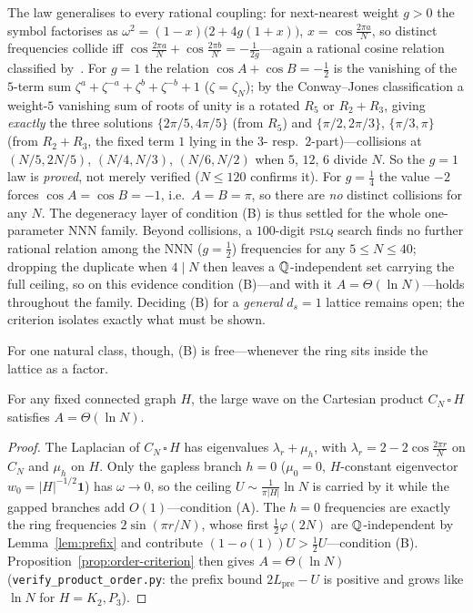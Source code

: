 \noindent The law generalises to every rational coupling: for next-nearest weight $g>0$ the symbol
factorises as $\omega^2=(1-x)\bigl(2+4g(1+x)\bigr)$, $x=\cos\tfrac{2\pi a}N$, so distinct frequencies
collide iff $\cos\tfrac{2\pi a}N+\cos\tfrac{2\pi b}N=-\tfrac1{2g}$---again a rational cosine relation
classified by~\cite{CJ}. For $g=1$ the relation $\cos A+\cos B=-\tfrac12$ is the
vanishing of the $5$-term sum $\zeta^a+\zeta^{-a}+\zeta^b+\zeta^{-b}+1$ ($\zeta=\zeta_N$); by the Conway--Jones
classification a weight-$5$ vanishing sum of roots of unity is a rotated $R_5$ or $R_2{+}R_3$, giving
\emph{exactly} the three solutions $\{2\pi/5,4\pi/5\}$ (from $R_5$) and $\{\pi/2,2\pi/3\}$, $\{\pi/3,\pi\}$ (from
$R_2{+}R_3$, the fixed term $1$ lying in the $3$- resp.\ $2$-part)---collisions at $(N/5,2N/5)$, $(N/4,N/3)$,
$(N/6,N/2)$ when $5$, $12$, $6$ divide $N$. So the $g=1$ law is \emph{proved}, not merely verified ($N\le120$
confirms it). For $g=\tfrac14$ the value $-2$ forces $\cos A=\cos B=-1$, i.e.\ $A=B=\pi$, so there are \emph{no}
distinct collisions for any $N$. The degeneracy layer of condition (B) is thus
settled for the whole one-parameter NNN family. Beyond collisions, a $100$-digit \textsc{pslq} search finds
no further rational relation among the NNN ($g=\tfrac12$) frequencies for any $5\le N\le40$; dropping the
duplicate when $4\mid N$ then leaves a $\mathbb{Q}$-independent set carrying the full ceiling, so on this evidence
condition (B)---and with it $A=\Theta(\ln N)$---holds throughout the family. Deciding (B) for a
\emph{general} $d_s=1$ lattice remains open; the criterion isolates exactly what must be shown.

For one natural class, though, (B) is free---whenever the ring sits inside the lattice as a factor.

\begin{corollary}\label{cor:product}
For any fixed connected graph $H$, the large wave on the Cartesian product $C_N\,\square\,H$ satisfies
$A=\Theta(\ln N)$.
\end{corollary}

\begin{proof}
The Laplacian of $C_N\,\square\,H$ has eigenvalues $\lambda_r+\mu_h$, with $\lambda_r=2-2\cos\tfrac{2\pi r}N$
on $C_N$ and $\mu_h$ on $H$. Only the gapless branch $h=0$ ($\mu_0=0$, $H$-constant eigenvector
$w_0=|H|^{-1/2}\mathbf1$) has $\omega\to0$, so the ceiling $U\sim\tfrac1{\pi|H|}\ln N$ is carried by it
while the gapped branches add $O(1)$---condition (A). The $h=0$ frequencies are exactly the ring
frequencies $2\sin(\pi r/N)$, whose first $\tfrac12\varphi(2N)$ are $\mathbb{Q}$-independent by
Lemma~\ref{lem:prefix} and contribute $(1-o(1))U>\tfrac12U$---condition (B). Proposition~\ref{prop:order-criterion}
then gives $A=\Theta(\ln N)$ (\texttt{verify\_product\_order.py}: the prefix bound $2L_{\mathrm{pre}}-U$ is
positive and grows like $\ln N$ for $H=K_2,P_3$). \end{proof}

